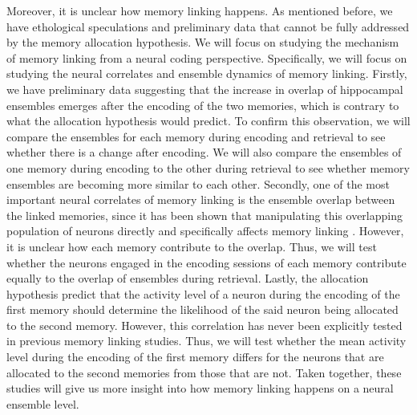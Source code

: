 \documentclass[master.tex]{subfiles}
\begin{document}
Moreover, it is unclear how memory linking happens. As mentioned before, we have
ethological speculations and preliminary data that cannot be fully addressed by
the memory allocation hypothesis. We will focus on studying the mechanism of
memory linking from a neural coding perspective. Specifically, we will focus on
studying the neural correlates and ensemble dynamics of memory linking. Firstly,
we have preliminary data suggesting that the increase in overlap of hippocampal
ensembles emerges after the encoding of the two memories, which is contrary to
what the allocation hypothesis would predict. To confirm this observation, we
will compare the ensembles for each memory during encoding and retrieval to see
whether there is a change after encoding. We will also compare the ensembles of
one memory during encoding to the other during retrieval to see whether memory
ensembles are becoming more similar to each other. Secondly, one of the most
important neural correlates of memory linking is the ensemble overlap between
the linked memories, since it has been shown that manipulating this overlapping
population of neurons directly and specifically affects memory linking
\cite{yokose_overlapping_2017}. However, it is unclear how each memory
contribute to the overlap. Thus, we will test whether the neurons engaged in the
encoding sessions of each memory contribute equally to the overlap of ensembles
during retrieval. Lastly, the allocation hypothesis predict that the activity
level of a neuron during the encoding of the first memory should determine the
likelihood of the said neuron being allocated to the second memory. However,
this correlation has never been explicitly tested in previous memory linking
studies. Thus, we will test whether the mean activity level during the encoding
of the first memory differs for the neurons that are allocated to the second
memories from those that are not. Taken together, these studies will give us
more insight into how memory linking happens on a neural ensemble level.
\end{document}
